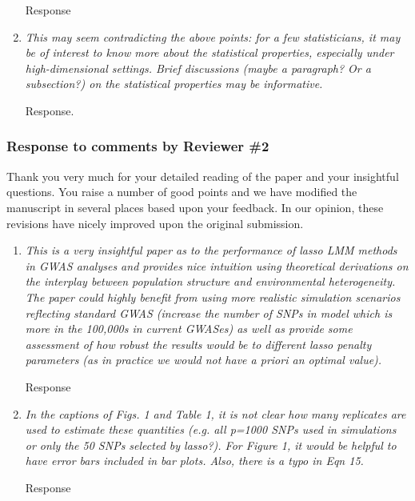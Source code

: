 \documentclass{article}
\begin{document}
\begin{enumerate}
  Response

\item \emph{This may seem contradicting the above points: for a few statisticians, it may be of interest to know more about the statistical properties, especially under high-dimensional settings. Brief discussions (maybe a paragraph? Or a subsection?) on the statistical properties may be informative.}

  Response.

\end{enumerate}

\newpage

\subsubsection*{Response to comments by Reviewer \#2}

Thank you very much for your detailed reading of the paper and your insightful questions. You raise a number of good points and we have modified the manuscript in several places based upon your feedback.  In our opinion, these revisions have nicely improved upon the original submission.

\begin{enumerate}

\item \emph{This is a very insightful paper as to the performance of lasso LMM methods in GWAS analyses and provides nice intuition using theoretical derivations on the interplay between  population structure and environmental heterogeneity. The paper could highly benefit from using more realistic simulation scenarios reflecting standard GWAS (increase the number of SNPs in model which is more in the 100,000s in current GWASes) as well as provide some assessment of how robust the results would be to different lasso penalty parameters (as in practice we would not have a priori an optimal value).}

  Response

\item \emph{In the captions of Figs. 1 and Table 1, it is not clear how many replicates are used to estimate these quantities (e.g. all p=1000 SNPs used in simulations or only the 50 SNPs selected by lasso?). For Figure 1, it would be helpful to have error bars included in bar plots. Also, there is a typo in Eqn 15.}

  Response

\end{enumerate}

%
%
\end{document}
